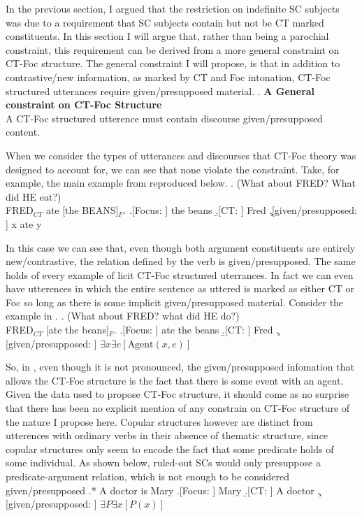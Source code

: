 \documentclass[GPFinal]{subfiles}
\begin{document}
In the previous section, I argued that the restriction on indefinite SC subjects was due to a requirement that SC subjects contain but not be CT marked constituents.
In this section I will argue that, rather than being a parochial constraint, this requirement can be derived from a more general constraint on CT-Foc structure.
The general constraint I will propose, is that in addition to contrastive/new information, as marked by CT and Foc intonation, CT-Foc structured utterances require given/presupposed material.
\ex. \textbf{A General constraint on CT-Foc Structure}\\
A CT-Foc structured utterence must contain discourse given/presupposed content.

When we consider the types of utterances and discourses that CT-Foc theory was designed to account for, we can see that none violate the constraint.
Take, for example, the main example from \textcite{jackendoff1972Ssemantics} reproduced below.
\ex. (What about FRED? What did HE eat?)\\
FRED$_{CT}$ ate [the BEANS]$_F$.
\a.[Focus: ] the beans
\b.[CT: ] Fred
\c.[given/presupposed: ] x ate y

In this case we can see that, even though both argument constituents are entirely new/contrastive, the relation defined by the verb is given/presupposed.
The same holds of every example of licit CT-Foc structured uterrances.
In fact we can even have utterences in which the entire sentence as uttered is marked as either CT or Foc so long as there is some implicit given/presupposed material.
Consider the example in \Next.
\ex. (What about FRED? what did HE do?)\\
FRED$_{CT}$ [ate the beans]$_F$.
\a.[Focus: ] ate the beans
\b.[CT: ] Fred
\c.[given/presupposed: ] $\exists x\exists e[\text{Agent}(x,e)]$

So, in \Last, even though it is not pronounced, the given/presupposed infomation that allows the CT-Foc structure is the fact that there is some event with an agent.
Given the data used to propose CT-Foc structure, it should come as no surprise that there has been no explicit mention of any constrain on CT-Foc structure of the nature I propose here.
Copular structures however are distinct from utterences with ordinary verbs in their absence of thematic structure, since copular structures only seem to encode the fact that some predicate holds of some individual.
As shown below, ruled-out SCs would only presuppose a predicate-argument relation, which is not enough to be considered given/presupposed
\ex.* A doctor is Mary
\a.[Focus: ] Mary
\b.[CT: ] A doctor
\c.[given/presupposed: ] $\exists P\exists x[P(x)]$
\end{document}
